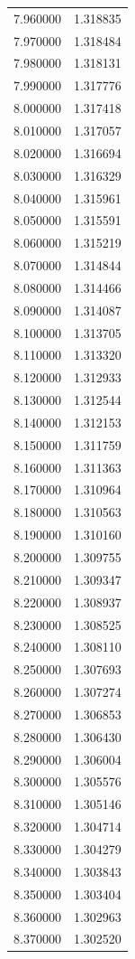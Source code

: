 \begin{tabular}{rr}
7.960000 & 1.318835 \\
7.970000 & 1.318484 \\
7.980000 & 1.318131 \\
7.990000 & 1.317776 \\
8.000000 & 1.317418 \\
8.010000 & 1.317057 \\
8.020000 & 1.316694 \\
8.030000 & 1.316329 \\
8.040000 & 1.315961 \\
8.050000 & 1.315591 \\
8.060000 & 1.315219 \\
8.070000 & 1.314844 \\
8.080000 & 1.314466 \\
8.090000 & 1.314087 \\
8.100000 & 1.313705 \\
8.110000 & 1.313320 \\
8.120000 & 1.312933 \\
8.130000 & 1.312544 \\
8.140000 & 1.312153 \\
8.150000 & 1.311759 \\
8.160000 & 1.311363 \\
8.170000 & 1.310964 \\
8.180000 & 1.310563 \\
8.190000 & 1.310160 \\
8.200000 & 1.309755 \\
8.210000 & 1.309347 \\
8.220000 & 1.308937 \\
8.230000 & 1.308525 \\
8.240000 & 1.308110 \\
8.250000 & 1.307693 \\
8.260000 & 1.307274 \\
8.270000 & 1.306853 \\
8.280000 & 1.306430 \\
8.290000 & 1.306004 \\
8.300000 & 1.305576 \\
8.310000 & 1.305146 \\
8.320000 & 1.304714 \\
8.330000 & 1.304279 \\
8.340000 & 1.303843 \\
8.350000 & 1.303404 \\
8.360000 & 1.302963 \\
8.370000 & 1.302520 \\

\end{tabular}
